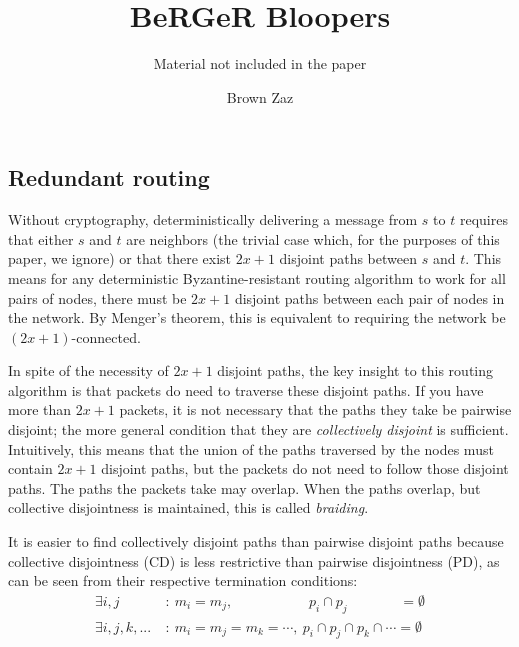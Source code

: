\documentclass{llncs}
\title{BeRGeR Bloopers}
\subtitle{Material not included in the paper}
\author{Brown Zaz}
\institute{Department of Computer Science, Kent State University, Kent, OH 44242, USA\\
\email{zbrown@cs.kent.edu}}
\date{}
\def\ByzN{x}  %
\begin{document}
\maketitle
\thispagestyle{plain}
\pagestyle{plain}


\subsection{Redundant routing}
Without cryptography, deterministically delivering a message from \(s\) to \(t\) requires that either \(s\) and \(t\) are neighbors (the trivial case which, for the purposes of this paper, we ignore) or that there exist \(2\ByzN + 1\) disjoint paths between \(s\) and \(t\). This means for any deterministic Byzantine-resistant routing algorithm to work for all pairs of nodes, there must be \(2\ByzN + 1\) disjoint paths between each pair of nodes in the network. By Menger's theorem, this is equivalent to requiring the network be \((2\ByzN + 1)\)-connected.

In spite of the necessity of \(2\ByzN + 1\) disjoint paths, the key insight to this routing algorithm is that packets do need to traverse these disjoint paths. If you have more than \(2\ByzN + 1\) packets, it is not necessary that the paths they take be pairwise disjoint; the more general condition that they are \emph{collectively disjoint} is sufficient. Intuitively, this means that the union of the paths traversed by the nodes must contain \(2\ByzN + 1\) disjoint paths, but the packets do not need to follow those disjoint paths. The paths the packets take may overlap. When the paths overlap, but collective disjointness is maintained, this is called \emph{braiding}.

It is easier to find collectively disjoint paths than pairwise disjoint paths because collective disjointness (CD) is less restrictive than pairwise disjointness (PD), as can be seen from their respective termination conditions:
\begin{align*}
    \exists i, j\phantom{, k, ...} \ &: \ m_i = m_j, \phantom{ = m_k = \cdots,} \ p_i \cap p_j \phantom{\cap p_k \cap \cdots} \ = \emptyset \tag{PD} \\
    \exists i, j         , k, ...  \ &: \ m_i = m_j            = m_k = \cdots,  \ p_i \cap p_j          \cap p_k \cap \cdots  = \emptyset \tag{CD}
\end{align*}
\end{document}
